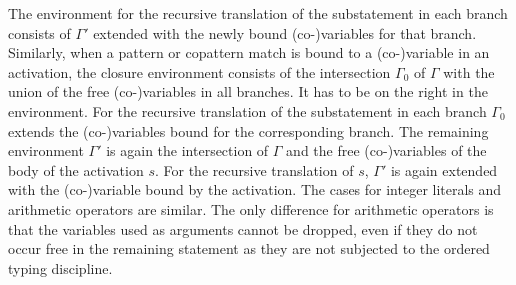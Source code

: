 The environment for the recursive translation of the substatement in each branch consists of $\Gamma'$ extended with the newly bound (co-)variables for that branch.
Similarly, when a pattern or copattern match is bound to a (co-)variable in an activation, the closure environment consists of the intersection $\Gamma_0$ of $\Gamma$ with the union of the free (co-)variables in all branches.
It has to be on the right in the environment.
For the recursive translation of the substatement in each branch $\Gamma_0$ extends the (co-)variables bound for the corresponding branch.
The remaining environment $\Gamma'$ is again the intersection of $\Gamma$ and the free (co-)variables of the body of the activation $s$.
For the recursive translation of $s$, $\Gamma'$ is again extended with the (co-)variable bound by the activation.
The cases for integer literals and arithmetic operators are similar.
The only difference for arithmetic operators is that the variables used as arguments cannot be dropped, even if they do not occur free in the remaining statement as they are not subjected to the ordered typing discipline.
